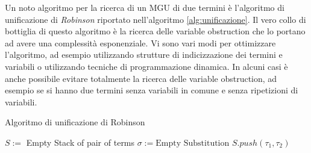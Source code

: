 \documentclass[./main.tex]{subfiles}
\begin{document}
Un noto algoritmo per la ricerca di un MGU di due termini è l'algoritmo di unificazione di \textit{Robinson} riportato nell'algoritmo \ref{alg:unificazione}.
Il vero collo di bottiglia di questo algoritmo è la ricerca delle variable obstruction che lo portano ad avere una complessità esponenziale.
Vi sono vari modi per ottimizzare l'algoritmo, 
ad esempio utilizzando strutture di indicizzazione dei termini e variabili o utilizzando tecniche di programmazione dinamica.
In alcuni casi è anche possibile evitare totalmente la ricerca delle variable obstruction, ad esempio se 
si hanno due termini senza variabili in comune e senza ripetizioni di variabili.

\begin{algorithm}[H] \label{alg:unificazione}
  \small
  \caption{Algoritmo di unificazione di Robinson}


  $S :=$ Empty Stack of pair of terms\;
  $\sigma := \text{Empty Substitution}$\;
  \BlankLine
  $S.push(\tau_1, \tau_2)$\;

  \Return{$\sigma$}\;
\end{algorithm}

\end{document}
